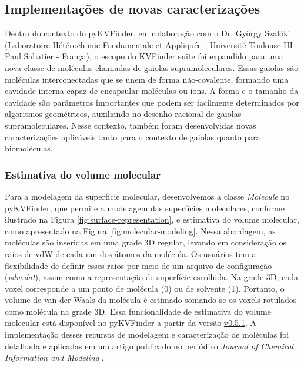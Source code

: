 \documentclass[Portugues]{phdquali}
\begin{document}
\subsection{Implementações de novas caracterizações}

Dentro do contexto do pyKVFinder, em colaboração com o Dr. György Szalóki (Laboratoire Hétérochimie Fondamentale et Appliquée - Université Toulouse III Paul Sabatier - França), o escopo do KVFinder suite foi expandido para uma nova classe de moléculas chamadas de gaiolas supramoleculares. Essas gaiolas são moléculas interconectadas que se unem de forma não-covalente, formando uma cavidade interna capaz de encapsular moléculas ou íons. A forma e o tamanho da cavidade são parâmetros importantes que podem ser facilmente determinados por algoritmos geométricos, auxiliando no desenho racional de gaiolas supramoleculares. Nesse contexto, também foram desenvolvidas novas caracterizações aplicáveis tanto para o contexto de gaiolas quanto para biomoléculas.

\subsubsection{Estimativa do volume molecular}

Para a modelagem da superfície molecular, desenvolvemos a classe \textit{Molecule} no pyKVFinder, que permite a modelagem das superfícies moleculares, conforme ilustrado na Figura \ref{fig:surface-representation}, e estimativa do volume molecular, como apresentado na Figura \ref{fig:molecular-modeling}. Nessa abordagem, as moléculas são inseridas em uma grade 3D regular, levando em consideração os raios de vdW de cada um dos átomos da molécula. Os usuários tem a flexibilidade de definir esses raios por meio de um arquivo de configuração (\textit{\href{https://github.com/LBC-LNBio/pyKVFinder/blob/master/pyKVFinder/data/vdw.dat}{vdw.dat}}), assim como a representação de superfície escolhida. Na grade 3D, cada voxel corresponde a um ponto de molécula (0) ou de solvente (1). Portanto, o volume de van der Waals da molécula é estimado somando-se os voxels rotulados como molécula na grade 3D. Essa funcionalidade de estimativa do volume molecular está disponível no pyKVFinder a partir da versão \href{https://github.com/LBC-LNBio/pyKVFinder/tree/v0.5.1}{v0.5.1}. A implementação desses recursos de modelagem e caracterização de moléculas foi detalhada e aplicadas em um artigo publicado no periódico \textit{Journal of Chemical Information and Modeling} \cite{guerra2023B}.
\end{document}
